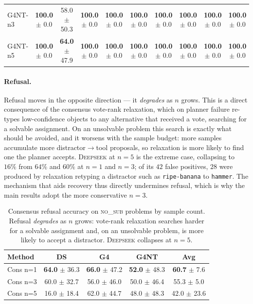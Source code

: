 \begin{table}[ht]
{\begin{tabular}{l|ccccc|cccc}
G4NT-n3     & \textbf{100.0} $\pm$ 0.0 & 58.0 $\pm$ 50.3 & \textbf{100.0} $\pm$ 0.0 & \textbf{100.0} $\pm$ 0.0 & \textbf{100.0} $\pm$ 0.0 & \textbf{100.0} $\pm$ 0.0 & \textbf{100.0} $\pm$ 0.0 & \textbf{100.0} $\pm$ 0.0 & \textbf{100.0} $\pm$ 0.0 \\
G4NT-n5     & \textbf{100.0} $\pm$ 0.0 & \textbf{64.0} $\pm$ 47.9 & \textbf{100.0} $\pm$ 0.0 & \textbf{100.0} $\pm$ 0.0 & \textbf{100.0} $\pm$ 0.0 & \textbf{100.0} $\pm$ 0.0 & \textbf{100.0} $\pm$ 0.0 & \textbf{100.0} $\pm$ 0.0 & \textbf{100.0} $\pm$ 0.0 \\
\bottomrule
\end{tabular}}
\end{table}

\paragraph{Refusal.} Refusal moves in the opposite direction --- it \emph{degrades} as
$n$ grows. This is a direct consequence of the consensus vote-rank relaxation, which on
planner failure re-types low-confidence objects to any alternative that received a vote,
searching for a solvable assignment. On an unsolvable problem this search is exactly what
should be avoided, and it worsens with the sample budget: more samples accumulate more
distractor$\rightarrow$tool proposals, so relaxation is more likely to find one the
planner accepts. \textsc{Deepseek} at $n{=}5$ is the extreme case, collapsing to $16\%$
from $64\%$ and $60\%$ at $n{=}1$ and $n{=}3$; of its $42$ false positives, $28$ were
produced by relaxation retyping a distractor such as \texttt{ripe-banana} to
\texttt{hammer}. The mechanism that aids recovery thus directly undermines refusal, which
is why the main results adopt the more conservative $n{=}3$.

\begin{table}[ht]
\centering
\caption{Consensus refusal accuracy on \textsc{no\_sub} problems by sample count. Refusal \emph{degrades} as $n$ grows: vote-rank relaxation searches harder for a solvable assignment and, on an unsolvable problem, is more likely to accept a distractor. \textsc{Deepseek} collapses at $n{=}5$.}
\label{tab:consensus_refusal}
\footnotesize
\renewcommand{\arraystretch}{0.9}
\begin{tabular}{l|ccc|c}
\toprule
\textbf{Method} & \textbf{DS} & \textbf{G4} & \textbf{G4NT} & \textbf{Avg} \\
\midrule
Cons n=1   & \textbf{64.0} $\pm$ 36.3 & \textbf{66.0} $\pm$ 47.2 & \textbf{52.0} $\pm$ 48.3 & \textbf{60.7} $\pm$ 7.6 \\
Cons n=3   & 60.0 $\pm$ 32.7 & 56.0 $\pm$ 46.0 & 50.0 $\pm$ 46.4 & 55.3 $\pm$ 5.0 \\
Cons n=5   & 16.0 $\pm$ 18.4 & 62.0 $\pm$ 44.7 & 48.0 $\pm$ 48.3 & 42.0 $\pm$ 23.6 \\
\bottomrule
\end{tabular}
\end{table}


